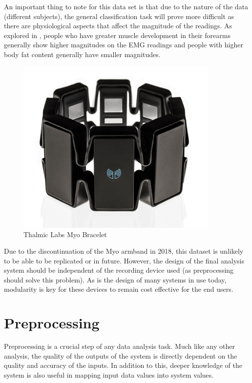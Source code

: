 \documentclass[11pt]{article}
\begin{document}
	\noindent
	An important thing to note for this data set is that due to the nature of the data (different subjects), the general classification task will prove more difficult as there are physiological aspects that affect the magnitude of the readings. As explored in \cite{Lobov2018}, people who have greater muscle development in their forearms generally show higher magnitudes on the EMG readings and people with higher body fat content generally have smaller magnitudes.
	
	\begin{figure}[H]
		\centering
		\includegraphics[width=10cm]{Figures/myo_armband}
		\caption{Thalmic Labs Myo Bracelet}
		\label{fig:myo}
	\end{figure}

	\noindent
	Due to the discontinuation of the Myo armband in 2018, this dataset is unlikely to be able to be replicated or in future. However, the design of the final analysis system should be independent of the recording device used (as preprocessing should solve this problem). As is the design of many systems in use today, modularity is key for these devices to remain cost effective for the end users. 
	
	\section{Preprocessing}
	Preprocessing is a crucial step of any data analysis task. Much like any other analysis, the quality of the outputs of the system is directly dependent on the quality and accuracy of the inputs. In addition to this, deeper knowledge of the system is also useful in mapping input data values into system values.\\
	
\end{document}
